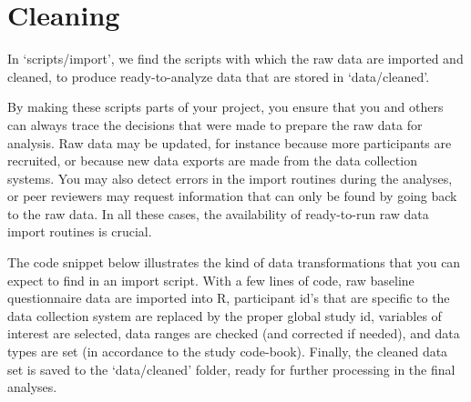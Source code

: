 \documentclass[]{book}
\begin{document}
\section{Cleaning}\label{cleaning}

In `scripts/import', we find the scripts with which the raw data are
imported and cleaned, to produce ready-to-analyze data that are stored
in `data/cleaned'.

By making these scripts parts of your project, you ensure that you and
others can always trace the decisions that were made to prepare the raw
data for analysis. Raw data may be updated, for instance because more
participants are recruited, or because new data exports are made from
the data collection systems. You may also detect errors in the import
routines during the analyses, or peer reviewers may request information
that can only be found by going back to the raw data. In all these
cases, the availability of ready-to-run raw data import routines is
crucial.

The code snippet below illustrates the kind of data transformations that
you can expect to find in an import script. With a few lines of code,
raw baseline questionnaire data are imported into R, participant id's
that are specific to the data collection system are replaced by the
proper global study id, variables of interest are selected, data ranges
are checked (and corrected if needed), and data types are set (in
accordance to the study code-book). Finally, the cleaned data set is
saved to the `data/cleaned' folder, ready for further processing in the
final analyses.
\end{document}
